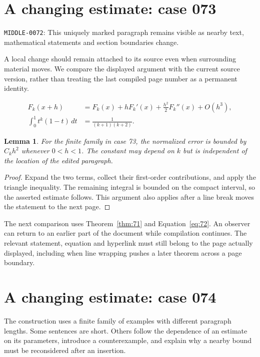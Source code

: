 \documentclass[a4paper,10pt]{article}
\newtheorem{lemma}[theorem]{Lemma}
\begin{document}
\lipsum[8]

\section{A changing estimate: case 073}\label{unit:72}
\hypertarget{varied:middle}{}\label{anchor:middle}
\noindent \texttt{MIDDLE-0072}: This uniquely marked paragraph remains visible as nearby text, mathematical statements and section boundaries change.

A local change should remain attached to its source even when surrounding material moves. We compare the displayed argument with the current source version, rather than treating the last compiled page number as a permanent identity.

\lipsum[7-8]
\begin{align}\label{eq:72}
 F_k(x+h)&=F_k(x)+hF_k'(x)+\frac{h^2}{2}F_k''(x)+O(h^3),\\
 \int_0^1 t^k(1-t)\,dt&=\frac{1}{(k+1)(k+2)}.
\end{align}
\begin{lemma}\label{thm:72}
For the finite family in case 73, the normalized error is bounded by $C_k h^2$ whenever $0<h<1$. The constant may depend on $k$ but is independent of the location of the edited paragraph.
\end{lemma}
\begin{proof}
Expand the two terms, collect their first-order contributions, and apply the
triangle inequality. The remaining integral is bounded on the compact interval,
so the asserted estimate follows. This argument also applies after a line break
moves the statement to the next page.
\end{proof}
The next comparison uses Theorem~\ref{thm:71} and Equation~\ref{eq:72}. An observer can return to an earlier part of the document while compilation continues. The relevant statement, equation and hyperlink must still belong to the page actually displayed, including when line wrapping pushes a later theorem across a page boundary.

\lipsum[13]

\section{A changing estimate: case 074}\label{unit:73}
The construction uses a finite family of examples with different paragraph lengths. Some sentences are short. Others follow the dependence of an estimate on its parameters, introduce a counterexample, and explain why a nearby bound must be reconsidered after an insertion.
\end{document}
